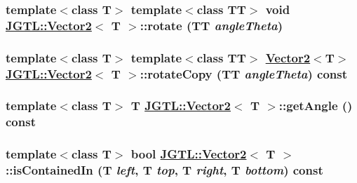 \hypertarget{class_j_g_t_l_1_1_vector2_8efb4a146ca7bc1b493b171c84db57f4}{
\subsubsection[rotate]{\setlength{\rightskip}{0pt plus 5cm}template$<$class T$>$ template$<$class TT$>$ void \hyperlink{class_j_g_t_l_1_1_vector2}{JGTL::Vector2}$<$ T $>$::rotate (TT {\em angle\-Theta})}}
\label{class_j_g_t_l_1_1_vector2_8efb4a146ca7bc1b493b171c84db57f4}


\hypertarget{class_j_g_t_l_1_1_vector2_85b831d986ba6fd215a4b6edd2cbeb0a}{
\subsubsection[rotateCopy]{\setlength{\rightskip}{0pt plus 5cm}template$<$class T$>$ template$<$class TT$>$ \hyperlink{class_j_g_t_l_1_1_vector2}{Vector2}$<$T$>$ \hyperlink{class_j_g_t_l_1_1_vector2}{JGTL::Vector2}$<$ T $>$::rotate\-Copy (TT {\em angle\-Theta}) const}}
\label{class_j_g_t_l_1_1_vector2_85b831d986ba6fd215a4b6edd2cbeb0a}


\hypertarget{class_j_g_t_l_1_1_vector2_a46fbd581c390ba8dfb519aafb0f0eb0}{
\subsubsection[getAngle]{\setlength{\rightskip}{0pt plus 5cm}template$<$class T$>$ T \hyperlink{class_j_g_t_l_1_1_vector2}{JGTL::Vector2}$<$ T $>$::get\-Angle () const}}
\label{class_j_g_t_l_1_1_vector2_a46fbd581c390ba8dfb519aafb0f0eb0}


\hypertarget{class_j_g_t_l_1_1_vector2_8dc6575b4e462cd443a16065ece3bfab}{
\subsubsection[isContainedIn]{\setlength{\rightskip}{0pt plus 5cm}template$<$class T$>$ bool \hyperlink{class_j_g_t_l_1_1_vector2}{JGTL::Vector2}$<$ T $>$::is\-Contained\-In (T {\em left}, T {\em top}, T {\em right}, T {\em bottom}) const}}
\label{class_j_g_t_l_1_1_vector2_8dc6575b4e462cd443a16065ece3bfab}




